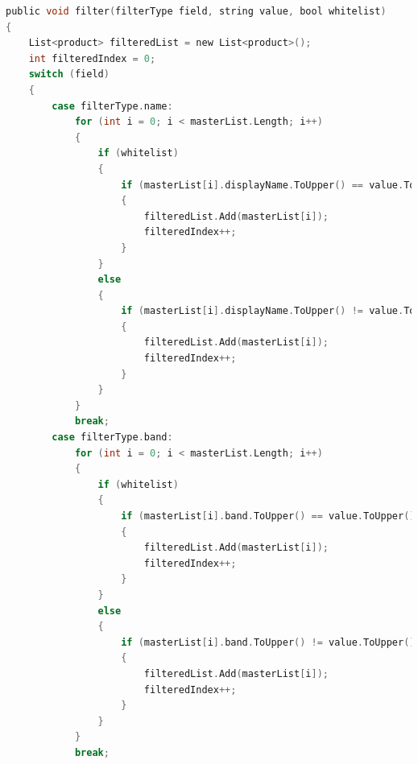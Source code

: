 ﻿\documentclass{article}
\begin{document}
\begin{enumerate}
\begin{lstlisting}[language=C]
public void filter(filterType field, string value, bool whitelist)
{
    List<product> filteredList = new List<product>();
    int filteredIndex = 0;
    switch (field)
    {
        case filterType.name:
            for (int i = 0; i < masterList.Length; i++)
            {
                if (whitelist)
                {
                    if (masterList[i].displayName.ToUpper() == value.ToUpper())
                    {
                        filteredList.Add(masterList[i]);
                        filteredIndex++;
                    }
                }
                else
                {
                    if (masterList[i].displayName.ToUpper() != value.ToUpper())
                    {
                        filteredList.Add(masterList[i]);
                        filteredIndex++;
                    }
                }
            }
            break;
        case filterType.band:
            for (int i = 0; i < masterList.Length; i++)
            {
                if (whitelist)
                {
                    if (masterList[i].band.ToUpper() == value.ToUpper())
                    {
                        filteredList.Add(masterList[i]);
                        filteredIndex++;
                    }
                }
                else
                {
                    if (masterList[i].band.ToUpper() != value.ToUpper())
                    {
                        filteredList.Add(masterList[i]);
                        filteredIndex++;
                    }
                }
            }
            break;


\end{lstlisting}
\end{enumerate}
\end{document}
